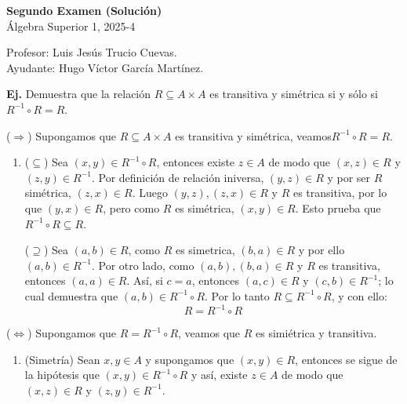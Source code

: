 \documentclass[letterpaper,DIV=14,headsepline,12pt]{scrartcl}
\makeatletter
\newcounter{Ejer}
\newcommand{\pts}{}
\newenvironment{ejercicio}[1]{\noindent
    \ifthenelse{\equal{#1}{1} \OR \equal{#1}{+1}}{\renewcommand{\pts}{\textbf{(#1 pt)}}}{\renewcommand{\pts}{\textbf{(#1 pts)}}}\textbf{Ej. \theEjer} \pts\stepcounter{Ejer}}{\vspace{.3cm}}
\renewenvironment{proof}[1][]{%
        \par\pushQED{\qed}%
        \normalfont\topsep6pt \partopsep0pt %
        \trivlist
        \item[\hskip\labelsep
                \textbf{\textit{Demostración.}}%
        ]#1
        }{%
        \popQED\endtrivlist\@endpefalse
    }
\makeatother
\begin{document}
    \begin{center}
        {\fontsize{30}{60}\rmfamily \textbf{Segundo Examen (Solución)}} \\ \vspace{.2cm}
            Álgebra Superior 1, 2025-4
    \end{center}

    \begin{flushright}
        \footnotesize \hfill Profesor: Luis Jesús Trucio Cuevas.\\
        \hfill Ayudante: Hugo Víctor García Martínez.
    \end{flushright}

    \begin{ejercicio}{2.5}
        Demuestra que la relación \(R\subseteq A\times A\) es transitiva y simétrica si y
        sólo si \(R^{-1}\circ R=R\).
    \end{ejercicio}
    \begin{proof}
        ($\Rightarrow$) Supongamos que $R \subseteq A \times A$ es transitiva y simétrica, veamos$R^{-1}\circ R=R$.
        \begin{enumerate}[\hspace{.3cm}]
            \item ($\subseteq$) Sea $(x,y) \in R^{-1}\circ R$, entonces existe $z \in A$ de modo que $(x,z) \in R$ y $(z,y) \in R^{-1}$. Por definición de relación iniversa, $(y,z) \in R$ y por ser $R$ simétrica, $(z,x) \in R$. Luego $(y,z),(z,x) \in R$ y $R$ es transitiva, por lo que $(y,x) \in R$, pero como $R$ es simétrica, $(x,y) \in R$. Esto prueba que $R^{-1}\circ R \subseteq R$.
            
            ($\supseteq$) Sea $(a,b) \in R$, como $R$ es simetrica, $(b,a) \in R$ y por ello $(a,b) \in R^{-1}$. Por otro lado, como $(a,b),(b,a) \in R$ y $R$ es transitiva, entonces $(a,a) \in R$. Así, si $c=a$, entonces $(a,c) \in R$ y $(c,b) \in R^{-1}$; lo cual demuestra que $(a,b) \in R^{-1} \circ R$. Por lo tanto $R \subseteq R^{-1} \circ R$, y con ello:
            \[ R=R^{-1}\circ R \]
        \end{enumerate}

        ($\Leftrightarrow$) Supongamos que $R=R^{-1}\circ R$, veamos que $R$ es simiétrica y transitiva.
        \begin{enumerate}[\hspace{.3cm}]
            \item (Simetría) Sean $x,y \in A$ y supongamos que $(x,y) \in R$, entonces se sigue de la hipótesis que $(x,y) \in R^{-1}\circ R$ y así, existe $z \in A$ de modo que $(x,z) \in R$ y $(z,y) \in R^{-1}$.
        \end{enumerate}
    \end{proof}
\end{document}
